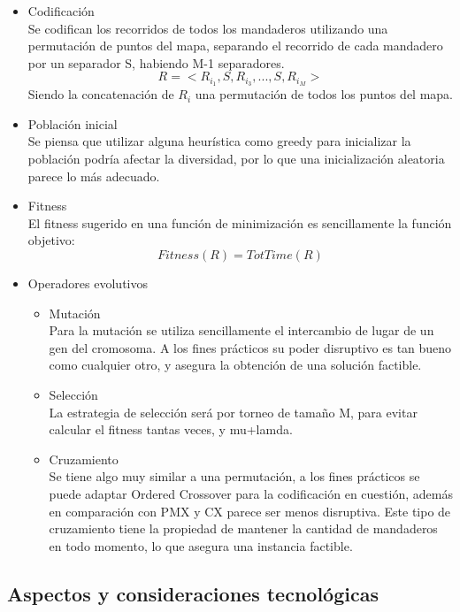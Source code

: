 \documentclass[9pt,conference]{IEEEtran}
\begin{document}
		\begin{itemize}

			\item
			Codificación\\
				Se codifican los recorridos de todos los mandaderos utilizando una permutación de puntos del mapa, separando el recorrido de cada mandadero por un separador S, habiendo M-1 separadores.
				\[ R = <R_{i_1}, S, R_{i_3}, ..., S, R_{i_M}> \]
				Siendo la concatenación de $R_i$ una permutación de todos los puntos del mapa.

			\item
			Población inicial\\
				Se piensa que utilizar alguna heurística como greedy para inicializar la población podría afectar la diversidad, por lo que una inicialización aleatoria parece lo más adecuado.

			\item
			Fitness\\
				El fitness sugerido en una función de minimización es sencillamente la función objetivo:
				\[ Fitness(R) = TotTime(R) \]

			\item
			Operadores evolutivos
			\begin{itemize}
				\item
				Mutación\\
					Para la mutación se utiliza sencillamente el intercambio de lugar de un gen del cromosoma. A los fines prácticos su poder disruptivo es tan bueno como cualquier otro, y asegura la obtención de una solución factible. 
				\item
				Selección\\
					La estrategia de selección será por torneo de tamaño M, para evitar calcular el fitness tantas veces, y mu+lamda.

				\item
				Cruzamiento\\
					Se tiene algo muy similar a una permutación, a los fines prácticos se puede adaptar Ordered Crossover para la codificación en cuestión, además en comparación con PMX y CX parece ser menos disruptiva. Este tipo de cruzamiento tiene la propiedad de mantener la cantidad de mandaderos en todo momento, lo que asegura una instancia factible.
			\end{itemize}
		\end{itemize}


	\subsection{Aspectos y consideraciones tecnológicas}
\end{document}
